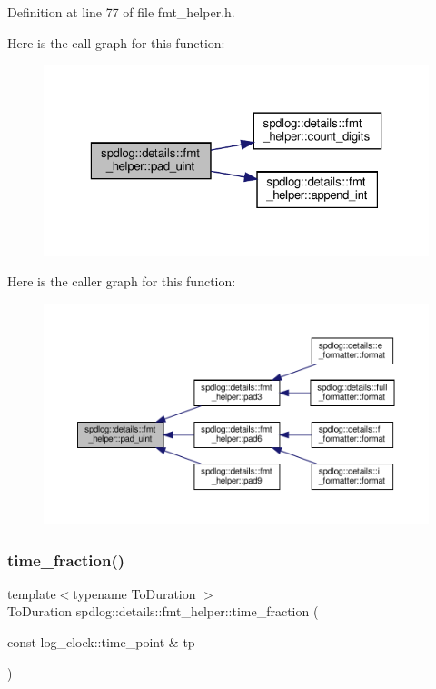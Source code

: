 Definition at line 77 of file fmt\+\_\+helper.\+h.

Here is the call graph for this function\+:
\nopagebreak
\begin{figure}[H]
\begin{center}
\leavevmode
\includegraphics[width=323pt]{namespacespdlog_1_1details_1_1fmt__helper_a569553750f9f2fa7b16c94a56a398de3_cgraph}
\end{center}
\end{figure}
Here is the caller graph for this function\+:
\nopagebreak
\begin{figure}[H]
\begin{center}
\leavevmode
\includegraphics[width=350pt]{namespacespdlog_1_1details_1_1fmt__helper_a569553750f9f2fa7b16c94a56a398de3_icgraph}
\end{center}
\end{figure}
\mbox{\label{namespacespdlog_1_1details_1_1fmt__helper_a27585b20ce58cd861f4e37be0057cc41}} 
\subsubsection{\texorpdfstring{time\+\_\+fraction()}{time\_fraction()}}
{\footnotesize\ttfamily template$<$typename To\+Duration $>$ \\
To\+Duration spdlog\+::details\+::fmt\+\_\+helper\+::time\+\_\+fraction (\begin{DoxyParamCaption}\item[{const log\+\_\+clock\+::time\+\_\+point \&}]{tp }\end{DoxyParamCaption})\hspace{0.3cm}{\ttfamily [inline]}}



